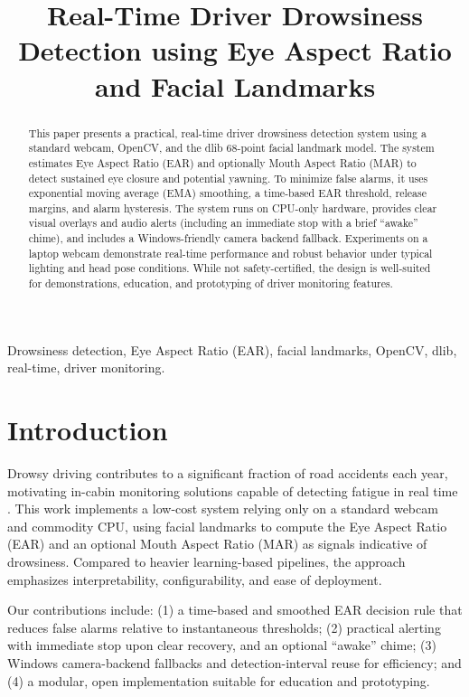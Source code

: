 \documentclass[conference]{IEEEtran}
\title{Real-Time Driver Drowsiness Detection using Eye Aspect Ratio and Facial Landmarks}
\author{\IEEEauthorblockN{Mohan [Surname]}
\IEEEauthorblockA{DriverDrowsinessDetection Project\\
Email: you@example.com}}
\begin{document}
\maketitle

\begin{abstract}
This paper presents a practical, real-time driver drowsiness detection system using a standard webcam, OpenCV, and the dlib 68-point facial landmark model. The system estimates Eye Aspect Ratio (EAR) and optionally Mouth Aspect Ratio (MAR) to detect sustained eye closure and potential yawning. To minimize false alarms, it uses exponential moving average (EMA) smoothing, a time-based EAR threshold, release margins, and alarm hysteresis. The system runs on CPU-only hardware, provides clear visual overlays and audio alerts (including an immediate stop with a brief ``awake'' chime), and includes a Windows-friendly camera backend fallback. Experiments on a laptop webcam demonstrate real-time performance and robust behavior under typical lighting and head pose conditions. While not safety-certified, the design is well-suited for demonstrations, education, and prototyping of driver monitoring features.
\end{abstract}

\begin{IEEEkeywords}
Drowsiness detection, Eye Aspect Ratio (EAR), facial landmarks, OpenCV, dlib, real-time, driver monitoring.
\end{IEEEkeywords}

\section{Introduction}
Drowsy driving contributes to a significant fraction of road accidents each year, motivating in-cabin monitoring solutions capable of detecting fatigue in real time \cite{nhtsa_drowsy}. This work implements a low-cost system relying only on a standard webcam and commodity CPU, using facial landmarks to compute the Eye Aspect Ratio (EAR) \cite{soukupova2016} and an optional Mouth Aspect Ratio (MAR) as signals indicative of drowsiness. Compared to heavier learning-based pipelines, the approach emphasizes interpretability, configurability, and ease of deployment.

Our contributions include: (1) a time-based and smoothed EAR decision rule that reduces false alarms relative to instantaneous thresholds; (2) practical alerting with immediate stop upon clear recovery, and an optional ``awake'' chime; (3) Windows camera-backend fallbacks and detection-interval reuse for efficiency; and (4) a modular, open implementation suitable for education and prototyping.
\end{document}
